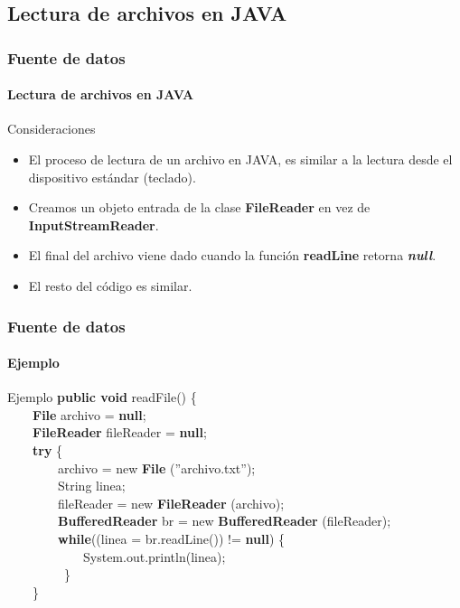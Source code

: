 \documentclass{beamer}
\begin{document}
		\subsection{Lectura de archivos en JAVA}

		\begin{frame}
			\frametitle{Fuente de datos}
			\framesubtitle{Lectura de archivos en JAVA}

			\begin{block}{Consideraciones}
				\begin{itemize}
					\item El proceso de lectura de un archivo en JAVA, es similar a la lectura desde el dispositivo est\'andar (teclado). 
					\item Creamos un objeto entrada de la clase \textbf{FileReader} en vez de \textbf{InputStreamReader}. 
					\item El final del archivo viene dado cuando la funci\'on \textbf{readLine} retorna \textbf{{\em null}}. 
					\item El resto del c\'odigo es similar.
				\end{itemize}
			\end{block}
		\end{frame}

		\begin{frame}
			\frametitle{Fuente de datos}
			\framesubtitle{Ejemplo}

			\begin{block}{Ejemplo}
			{\scriptsize
				\textbf{public void} readFile() \{ \\
				\ \ \ \ \textbf{File} archivo = \textbf{null}; \\ 
			         \ \ \ \ \textbf{FileReader} fileReader = \textbf{null};\\
				\ \ \ \ \textbf{try} \{ \\
                       		\ \ \ \ \ \ \ \ archivo = new \textbf{File} (''archivo.txt''); \\
				\ \ \ \ \ \ \ \ String linea; \\
				\ \ \ \ \ \ \ \ fileReader = new \textbf{FileReader} (archivo); \\
				\ \ \ \ \ \ \ \ \textbf{BufferedReader} br = new \textbf{BufferedReader} (fileReader); \\
				\ \ \ \ \ \ \ \ \textbf{while}((linea = br.readLine()) != \textbf{null}) \{ \\
				\ \ \ \ \ \ \ \ \ \ \ \ System.out.println(linea); \\
				\ \ \ \ \ \ \ \ \ \} \\
				\ \ \ \ \} \\
			}
			\end{block}
		\end{frame}
\end{document}
